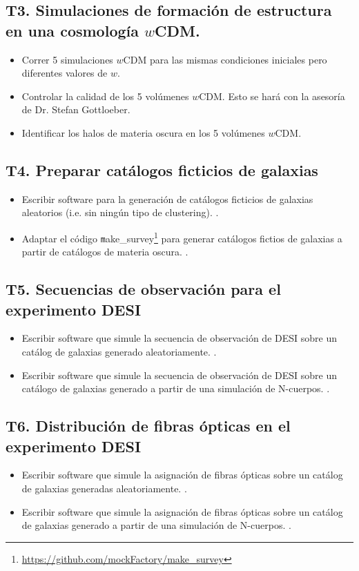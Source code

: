 \subsection*{T3. Simulaciones de formaci\'on de estructura en una
  cosmolog\'ia $w$CDM.}
\begin{itemize}
\item[T3.1] \gradA Correr 5 simulaciones $w$CDM para las mismas condiciones
  iniciales pero diferentes valores de $w$.
\item[T3.2] \gradA Controlar la calidad de los 5 vol\'umenes $w$CDM. Esto se
  har\'a con la asesor\'ia de Dr. Stefan Gottloeber.
\item[T3.3] \gradA Identificar los halos de materia oscura en los 5 vol\'umenes $w$CDM.
\end{itemize}

\subsection*{T4. Preparar cat\'alogos ficticios de galaxias}
\begin{itemize}
\item[T4.1] \gradA\prof Escribir software para la generaci\'on de cat\'alogos
  ficticios de galaxias aleatorios (i.e. sin ning\'un tipo de
  clustering). \bob.
\item[T4.2] \gradA\prof Adaptar el c\'odigo {\texttt
  make\_survey}\footnote{\url{https://github.com/mockFactory/make_survey}}
  para generar  cat\'alogos fictios de galaxias a partir de
  cat\'alogos de materia oscura. \bob.
\end{itemize}

\subsection*{T5. Secuencias de observaci\'on para el experimento DESI}
\begin{itemize}
\item[T5.1] \prof Escribir software que simule la secuencia de observaci\'on
  de DESI sobre un cat\'alog de galaxias generado aleatoriamente. \bob.
\item[T5.2] \prof Escribir software que simule la secuencia de observaci\'on
  de DESI sobre un cat\'alogo de galaxias generado a partir de una
  simulaci\'on de N-cuerpos. \bob.
\end{itemize}

\subsection*{T6. Distribuci\'on de fibras \'opticas en el experimento DESI}
\begin{itemize}
\item[T6.1] \prof Escribir software que simule la asignaci\'on de fibras
  \'opticas sobre un cat\'alog de galaxias generadas aleatoriamente.  \bob.
\item[T6.2] \prof Escribir software que simule la asignaci\'on de fibras
  \'opticas sobre un cat\'alog de galaxias generado a partir de una
  simulaci\'on de N-cuerpos. \bob.
\end{itemize}

